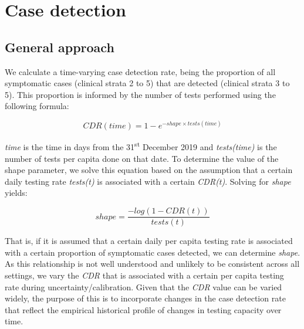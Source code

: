 \section{Case detection} \label{cdr}

\subsection{General approach}
We calculate a time-varying case detection rate, being the proportion of all symptomatic cases (clinical strata 2 to 5) that are detected (clinical strata 3 to 5). This proportion is informed by the number of tests performed using the following formula:

\[CDR(time)=1-e^{-shape \times tests(time)}\]

\textit{time} is the time in days from the 31\textsuperscript{st} December 2019 and \textit{tests(time)} is the number of tests per capita done on that date. To determine the value of the shape parameter, we solve this equation based on the assumption that a certain daily testing rate \textit{tests(t)} is associated with a certain \textit{CDR(t)}. Solving for \textit{shape} yields:

\[shape = \frac{-log(1 - CDR(t))}{tests(t)}\]

That is, if it is assumed that a certain daily per capita testing rate is associated with a certain proportion of symptomatic cases detected, we can determine \textit{shape}. As this relationship is not well understood and unlikely to be consistent across all settings, we vary the \textit{CDR} that is associated with a certain per capita testing rate during uncertainty/calibration. Given that the \textit{CDR} value can be varied widely, the purpose of this is to incorporate changes in the case detection rate that reflect the empirical historical profile of changes in testing capacity over time.
